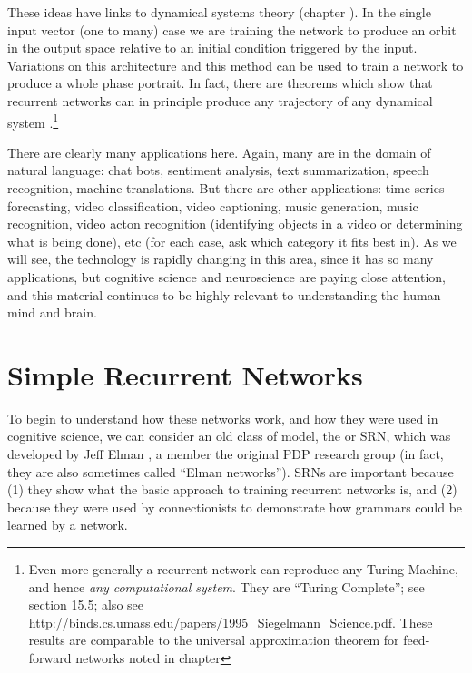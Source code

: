 These ideas have links to dynamical systems theory (chapter ). In the single input vector (one to many) case we are training the network to produce an orbit in the output space relative to an initial condition triggered by the input. Variations on this architecture and this method can be used to train a network to produce a whole phase portrait. In fact, there are theorems which show that recurrent networks can in principle produce any trajectory of any dynamical system \cite{funahashi1993approximation}.\footnote{Even more generally a recurrent network can reproduce any Turing Machine, and hence \emph{any computational system}. They are ``Turing Complete''; see \cite{haykin1998neural} section 15.5; also see \url{http://binds.cs.umass.edu/papers/1995_Siegelmann_Science.pdf}. These results are comparable to the universal approximation theorem for feed-forward networks noted in chapter } 

There are clearly many applications here. Again, many are in the domain of natural language: chat bots, sentiment analysis, text summarization, speech recognition, machine translations. But there are other applications: time series forecasting, video classification, video captioning, music generation, music recognition,  video acton recognition (identifying objects in a video or determining what is being done), etc (for each case, ask which category it fits best in).  As we will see, the technology is rapidly changing in this area, since it has so many applications, but cognitive science and neuroscience are paying close attention, and this material continues to be highly relevant to understanding the human mind and brain.

\section{Simple Recurrent Networks}

To begin to understand how these networks work, and how they were used in cognitive science, we can consider an old class of model, the  or SRN, which was developed by Jeff Elman \cite{elman1990finding}, a member the original PDP research group  (in fact, they are also sometimes called ``Elman networks''). SRNs are important because (1) they show what the basic approach to training recurrent networks is, and (2) because they were used by connectionists to demonstrate how grammars could be learned by a network. 

